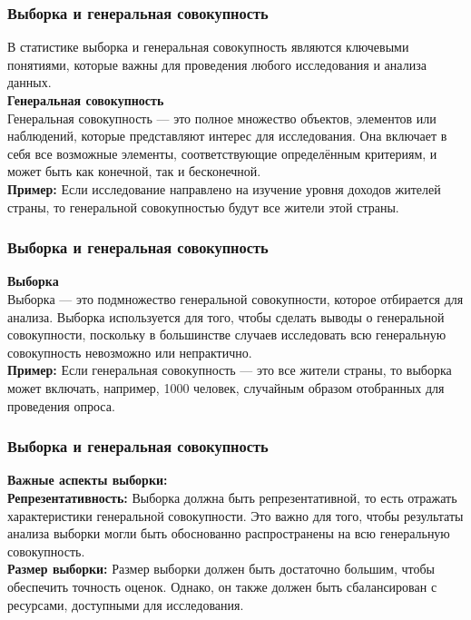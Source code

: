 \documentclass[aspectratio=169]{beamer}
\begin{document}
\begin{frame}
\frametitle{Выборка и генеральная совокупность}
В статистике выборка и генеральная совокупность являются ключевыми понятиями, которые важны для проведения любого исследования и анализа данных.
\newline\\
\textbf{Генеральная совокупность}
\newline\\
Генеральная совокупность — это полное множество объектов, элементов или наблюдений, которые представляют интерес для исследования. Она включает в себя все возможные элементы, соответствующие определённым критериям, и может быть как конечной, так и бесконечной.
\newline\\
\textbf{Пример:} Если исследование направлено на изучение уровня доходов жителей страны, то генеральной совокупностью будут все жители этой страны.
\end{frame}

\begin{frame}
\frametitle{Выборка и генеральная совокупность}
\textbf{Выборка}
\newline\\
Выборка — это подмножество генеральной совокупности, которое отбирается для анализа. Выборка используется для того, чтобы сделать выводы о генеральной совокупности, поскольку в большинстве случаев исследовать всю генеральную совокупность невозможно или непрактично.
\newline\\
\textbf{Пример:} Если генеральная совокупность — это все жители страны, то выборка может включать, например, 1000 человек, случайным образом отобранных для проведения опроса.
\end{frame}

\begin{frame}
\frametitle{Выборка и генеральная совокупность}
\textbf{Важные аспекты выборки:}
\newline\\
\textbf{Репрезентативность:} Выборка должна быть репрезентативной, то есть отражать характеристики генеральной совокупности. Это важно для того, чтобы результаты анализа выборки могли быть обоснованно распространены на всю генеральную совокупность.
\newline\\
\textbf{Размер выборки:} Размер выборки должен быть достаточно большим, чтобы обеспечить точность оценок. Однако, он также должен быть сбалансирован с ресурсами, доступными для исследования.
\end{frame}
\end{document}
